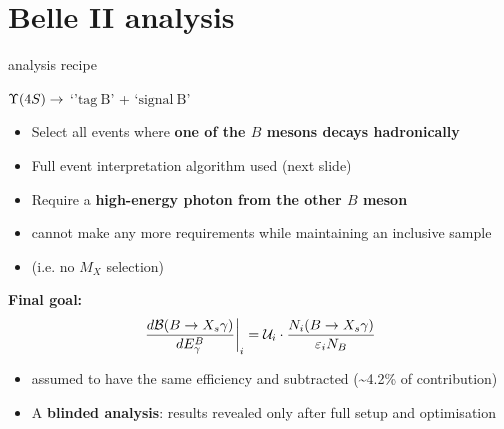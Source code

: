 \documentclass[xcolor=dvipsnames]{beamer}
\begin{document}
   \section{Belle II analysis}

   \begin{frame}{\BtoXsgamma analysis recipe}
      \scriptsize\centering
      
      $\FourS\ra$ `'$\mathrm{tag~B}$' + `$\mathrm{signal~B}$'
     
      \vspace{10pt}

      \begin{itemize}
         \item Select all events where \textbf{one of the $B$ mesons decays hadronically}
         \item[\to] Full event interpretation algorithm used (next slide)
         \item Require a \textbf{high-energy photon from the other $B$ meson}
         \item[\to] cannot make any more requirements while maintaining an inclusive sample 
         \item[] (i.e. no $M_X$ selection)
      \end{itemize}
\textbf{Final goal:}
      \begin{equation}\nonumber
         \left.\frac{d\mathcal{B}(\BtoXsgamma)}{d\EB}\right|_i = \mathcal{U}_i \cdot \frac{N_i(\BtoXsgamma)}{\varepsilon_i N_{B}}
      \end{equation}
      \begin{itemize}
         \item \BtoXdgamma assumed to have the same efficiency and subtracted (\sim 4.2\% of contribution)
         \item A \textbf{blinded analysis}: results revealed only after full setup and optimisation
      \end{itemize}

   \end{frame}
\end{document}
